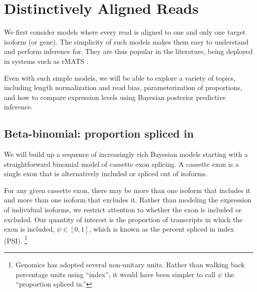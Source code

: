 \documentclass[11pt]{report}
\begin{document}
\chapter{Distinctively Aligned Reads}

We first consider models where every read is aligned to one and only
one target isoform (or gene). The simplicity of such models makes them
easy to understand and perform inference for. They are thus popular in
the literature, being deployed in systems such as rMATS
\citep{shen2014rmats}.

Even with such simple models, we will be able to explore a variety of
topics, including length normalization and read bias, parameterization
of proportions, and how to compare expression levels using Bayesian
posterior predictive inference.


\section{Beta-binomial: proportion spliced in}

We will build up a sequence of increasingly rich Bayesian models
starting with a straightforward binomial model of cassette exon
splicing. A cassette exon is a single exon that is alternatively
included or spliced out of isoforms.

For any given cassette exon, there may be more than one isoform that
includes it and more than one isoform that excludes it. Rather than
modeling the expression of individual isoforms, we restrict attention
to whether the exon is included or excluded. Our quantity of interest
is the proportion of transcripts in which the exon is included,
$\psi \in [0, 1]$, which is known as the percent spliced in index
(PSI).%
\footnote{Genomics has adopted several non-unitary units.
  Rather than walking back percentage units using ``index'', it would
  have been simpler to call $\psi$ the ``proportion spliced in.''}
\end{document}
